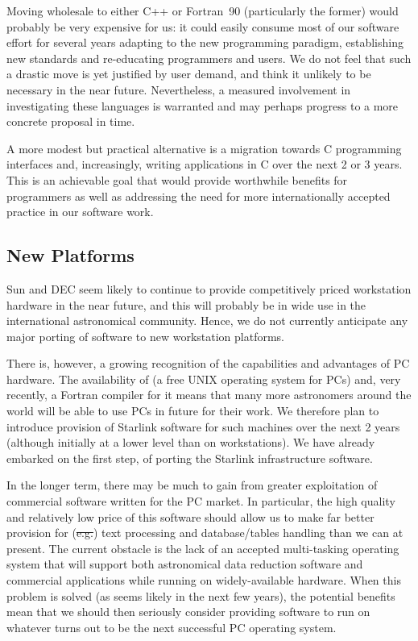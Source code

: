 Moving wholesale to either C++ or Fortran~90 (particularly the former)
would probably be very expensive for us: it could easily consume most
of our software effort for several years adapting to the new
programming paradigm, establishing new standards and re-educating
programmers and users. We do not feel that such a drastic move is yet
justified by user demand, and think it unlikely to be necessary in the
near future. Nevertheless, a measured involvement in investigating
these languages is warranted and may perhaps progress to a more
concrete proposal in time.

A more modest but practical alternative is a migration towards C
programming interfaces and, increasingly, writing applications in C
over the next 2 or 3 years. This is an achievable goal that would
provide worthwhile benefits for programmers as well as addressing the
need for more internationally accepted practice in our software work.

\subsection{New Platforms}

Sun and DEC seem likely to continue to provide competitively priced
workstation hardware in the near future, and this will probably be in
wide use in the international astronomical community. Hence, we do not
currently anticipate any major porting of software to new workstation
platforms.

There is, however, a growing recognition of the capabilities and
advantages of PC hardware. The availability of
 (a free UNIX operating system
for PCs) and, very recently, a Fortran compiler for it means that many
more astronomers around the world will be able to use PCs in future
for their work. We therefore plan to introduce provision of Starlink
software for such machines over the next 2 years (although initially
at a lower level than on workstations). We have already embarked on
the first step, of porting the Starlink infrastructure software.

In the longer term, there may be much to gain from greater
exploitation of commercial software written for the PC market. In
particular, the high quality and relatively low price of this software
should allow us to make far better provision for (\st{e.g.}) text
processing and database/tables handling than we can at present. The
current obstacle is the lack of an accepted multi-tasking operating
system that will support both astronomical data reduction software and
commercial applications while running on widely-available hardware.
When this problem is solved (as seems likely in the next few years),
the potential benefits mean that we should then seriously consider
providing software to run on whatever turns out to be the next
successful PC operating system.

